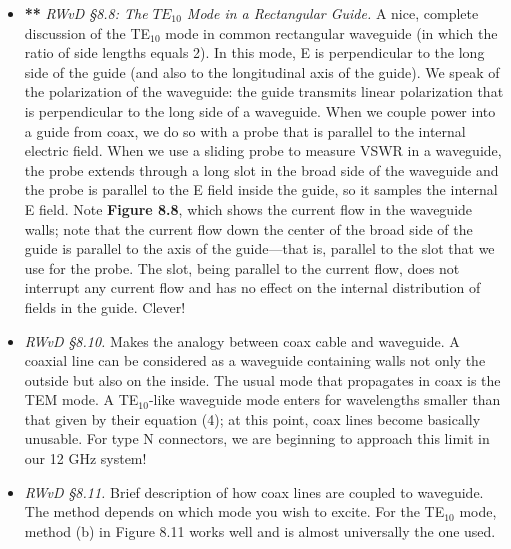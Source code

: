 \documentclass[11pt,preprint]{aastex}
\begin{document}
\begin{itemize}
\begin{itemize}
\item {\bf ***} {\it RWvD \S 8.8:  The $TE_{10}$ Mode in a Rectangular
Guide.} A nice, complete discussion of the TE$_{10}$ mode in common
rectangular waveguide (in which the ratio of side lengths equals 2). 
In this mode, E is perpendicular to the long side of the guide
(and also to the longitudinal axis of the guide).  We speak of the
polarization of the waveguide: the guide transmits linear polarization
that is perpendicular to the long side of a waveguide.  When we couple
power into a guide from coax, we do so with a probe that is parallel to
the internal electric field.  When we use a sliding probe to measure
VSWR in a waveguide, the probe extends through a long slot in the broad
side of the waveguide and the probe is parallel to the E field inside
the guide, so it samples the internal E field.  Note {\bf Figure 8.8},
which shows the current flow in the waveguide walls; note that the
current flow down the center of the broad side of the guide is parallel
to the axis of the guide---that is, parallel to the slot that we use for
the probe.  The slot, being parallel to the current flow, does not
interrupt any current flow and has no effect on the internal
distribution of fields in the guide.  Clever!

\item {\it RWvD \S 8.10.} Makes the analogy between coax cable and waveguide.
A coaxial line can be considered as a waveguide containing walls not
only the outside but also on the inside.  The usual mode that propagates
in coax is the TEM mode.  A TE$_{10}$-like waveguide mode enters for
wavelengths smaller than that given by their equation (4); at this
point, coax lines become basically unusable.  For type N connectors, we
are beginning to approach this limit in our 12 GHz system!

\item {\it RWvD \S 8.11.} Brief description of how coax lines are coupled to
waveguide. The method depends on which mode you wish to excite. For the
TE$_{10}$ mode, method (b) in Figure 8.11 works well and is almost
universally the one used.

\end{itemize}
\end{itemize}
\end{document}
